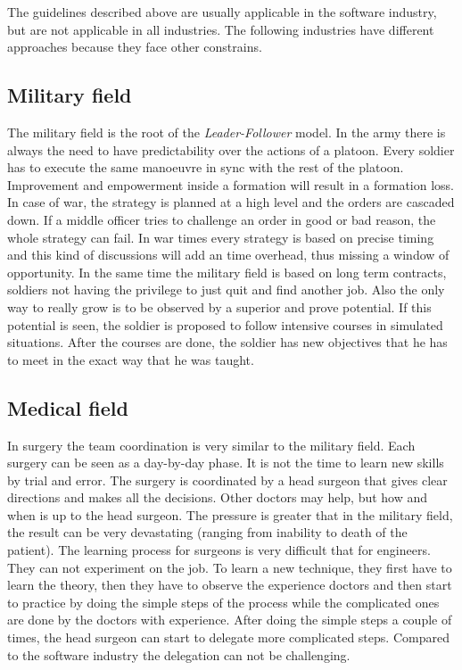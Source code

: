 The guidelines described above are usually applicable in the software industry, but are not applicable in all industries.
The following industries have different approaches because they face other constrains.

\subsection{Military field}
The military field is the root of the \textit{Leader-Follower} model. In the army there is always the need to have predictability over the actions of a platoon. Every soldier has to execute the same manoeuvre in sync with the rest of the platoon. Improvement and empowerment inside a formation will result in a formation loss. In case of war, the strategy is planned at a high level and the orders are cascaded down. If a middle officer tries to challenge an order in good or bad reason, the whole strategy can fail. In war times every strategy is based on precise timing and this kind of discussions will add an time overhead, thus missing a window of opportunity. In the same time the military field is based on long term contracts, soldiers not having the privilege to just quit and find another job. Also the only way to really grow is to be observed by a superior and prove potential. If this potential is seen, the soldier is proposed to follow intensive courses in simulated situations. After the courses are done, the soldier has new objectives that he has to meet in the exact way that he was taught. 

\subsection{Medical field}
In surgery the team coordination is very similar to the military field. Each surgery can be seen as a day-by-day phase. It is not the time to learn new skills by trial and error. The surgery is coordinated by a head surgeon that gives clear directions and makes all the decisions. Other doctors may help, but how and when is up to the head surgeon. The pressure is greater that in the military field, the result can be very devastating (ranging from inability to death of the patient). The learning process for surgeons is very difficult that for engineers. They can not experiment on the job. To learn a new technique, they first have to learn the theory, then they have to observe the experience doctors and then start to practice by doing the simple steps of the process while the complicated ones are done by the doctors with experience. After doing the simple steps a couple of times, the head surgeon can start to delegate more complicated steps. Compared to the software industry the delegation can not be challenging.